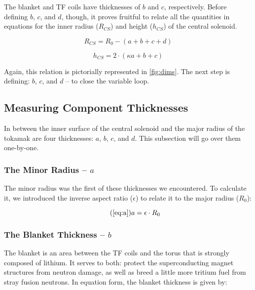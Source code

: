 \begin{figure*}
\centering

\caption{Dimensions of Tokamak Cross-Section}
\label{fig:dims}
\end{figure*}

The blanket and TF coils have thicknesses of $b$ and $c$, respectively. Before defining $b$, $c$, and $d$, though, it proves fruitful to relate all the quantities in equations for the inner radius ($R_{CS}$) and height ($h_{CS}$) of the central solenoid.
 
 \begin{equation}
 	\label{eq:rcs1}
 	R_{CS} = R_0 - ( a + b + c + d )
 \end{equation}
 
 \begin{equation}
	\label{eq:hcs1}
 	h_{CS} = 2 \cdot \left ( \kappa a + b + c \right)
 \end{equation}

Again, this relation is pictorially represented in \cref{fig:dims}. The next step is defining: $b$, $c$, and $d$ -- to close the variable loop.

\subsection{Measuring Component Thicknesses}
 
In between the inner surface of the central solenoid and the major radius of the tokamak are four thicknesses: $a$, $b$, $c$, and $d$. This subsection will go over them one-by-one.
 
\subsubsection{The Minor Radius -- $a$}

The minor radius was the first of these thicknesses we encountered. To calculate it, we introduced the inverse aspect ratio ($\epsilon$) to relate it to the major radius ($R_0$):

\begin{equation}
	\tag{\ref{eq:a}}
	a = \epsilon \cdot R_0
\end{equation}
 
\subsubsection{The Blanket Thickness -- $b$}

The blanket is an area between the TF coils and the torus that is strongly composed of lithium. It serves to both: protect the superconducting magnet structures from neutron damage, as well as breed a little more tritium fuel from stray fusion neutrons. In equation form, the blanket thickness is given by: \cite{minervini}

